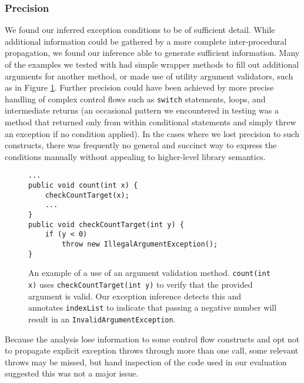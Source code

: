 \subsubsection{Precision}

We found our inferred exception conditions to be of sufficient detail.  While
additional information could be gathered by a more complete inter-procedural
propagation, we found our
inference able to generate sufficient information.  Many of the examples we
tested with had simple wrapper methods to
fill out additional arguments for another method, or made use of utility
argument validators, such as in Figure \ref{fig:argvalidate}.  Further precision
could have been achieved by more precise handling of complex control flows such
as \texttt{switch} statements, loops, and intermediate returns (an occasional
pattern we encountered in testing was a method that returned only from within
conditional statements and simply threw an exception if no condition applied).
In the cases where we lost precision to such constructs, there was frequently no
general and succinct way to express the conditions manually without appealing to
higher-level library semantics.

\begin{figure}
\begin{verbatim}
...
public void count(int x) {
    checkCountTarget(x);
    ...
}
public void checkCountTarget(int y) {
    if (y < 0)
        throw new IllegalArgumentException();
}
\end{verbatim}
\caption{An example of a use of an argument validation method.
\texttt{count(int x)} uses \texttt{checkCountTarget(int y)} to verify that the
provided argument is valid.  Our exception inference detects this and annotates
\texttt{indexList} to indicate that passing a negative number will result in an
\texttt{InvalidArgumentException}.}
\label{fig:argvalidate}
\end{figure}

Because the analysis lose information to some control flow constructs and opt not to
propagate explicit exception throws through more than one call, some relevant
throws may be missed, but hand inspection of the code used in our evaluation
suggested this was not a major issue.
